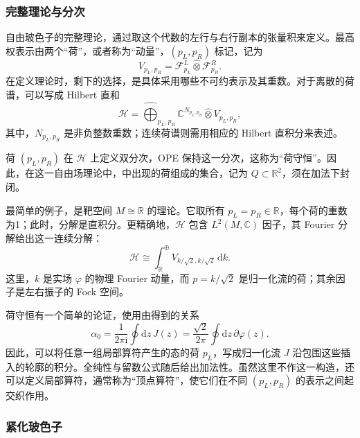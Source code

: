 \subsubsection{完整理论与分次}\label{sec:3.2.3.4}

自由玻色子的完整理论，通过取这个代数的左行与右行副本的张量积来定义。最高权表示由两个“荷”，或者称为“动量”，$(p_L,p_R)$ 标记，记为
\[
V_{p_L,p_R}=\mathcal{F}_{p_L}^{L}
\widehat\otimes\mathcal{F}_{p_R}^{R}.
\]
在定义理论时，剩下的选择，是具体采用哪些不可约表示及其重数。对于离散的荷谱，可以写成 Hilbert 直和
\begin{equation}\label{eq:3.53}
\mathcal{H}
=\widehat{\bigoplus}_{p_L,p_R}
\mathbb{C}^{N_{p_L,p_R}}\widehat\otimes V_{p_L,p_R},
\end{equation}
其中，$N_{p_L,p_R}$ 是非负整数重数；连续荷谱则需用相应的 Hilbert 直积分来表述。

荷 $(p_L,p_R)$ 在 $\mathcal{H}$ 上定义双分次，OPE 保持这一分次，这称为“荷守恒”。因此，在这一自由场理论中，中出现的荷组成的集合，记为 $Q\subset\mathbb{R}^2$，须在加法下封闭。

\begin{example*}
最简单的例子，是靶空间 $M\cong\mathbb{R}$ 的理论。它取所有 $p_L=p_R\in\mathbb{R}$，每个荷的重数为1；此时，分解是直积分。更精确地，$\mathcal{H}$ 包含 $L^2(M,\mathbb{C})$ 因子，其 Fourier 分解给出这一连续分解：
\[
\mathcal{H}\cong
\int_{\mathbb{R}}^\oplus V_{k/\sqrt2,k/\sqrt2}\,\mathrm{d}k.
\]
这里，$k$ 是实场 $\varphi$ 的物理 Fourier 动量，而 $p=k/\sqrt2$ 是归一化流的荷；其余因子是左右振子的 Fock 空间。
\end{example*}

荷守恒有一个简单的论证，使用由得到的关系
\[
\alpha_0=\frac1{2\pi\mathrm{i}}\oint\mathrm{d}z\,J(z)
=\frac{\sqrt2}{2\pi}\oint\mathrm{d}z\,\partial\varphi(z).
\]
因此，可以将任意一组局部算符产生的态的荷 $p_L$，写成归一化流 $J$ 沿包围这些插入的轮廓的积分。全纯性与留数公式随后给出加法性。虽然这里不作这一构造，还可以定义局部算符，通常称为“顶点算符”，使它们在不同 $(p_L,p_R)$ 的表示之间起交织作用。

\subsubsection{紧化玻色子}\label{sec:3.2.3.5}

